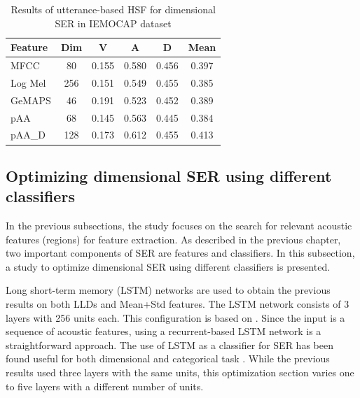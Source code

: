 
\begin{table}
    \caption{Results of utterance-based HSF for dimensional SER in IEMOCAP dataset}
    \begin{center}
    \begin{tabular}{l | c | c c c c}
      \hline
Feature & Dim & V & A & D & Mean \\
\hline \hline
MFCC      &   80  & 0.155 & 0.580   & 0.456 & 0.397 \\
Log Mel   &   256 & 0.151 & 0.549   & 0.455 & 0.385 \\
GeMAPS    &   46  & 0.191 & 0.523   & 0.452 & 0.389 \\
pAA       &   68  & 0.145 & 0.563   & 0.445 & 0.384 \\
pAA\_D     &  128  & 0.173 & 0.612   & 0.455 & 0.413 \\
      \hline
    \end{tabular}
    \label{tab:iemocap-hsf}
  \end{center}
\end{table}

\subsection{Optimizing dimensional SER using different classifiers}
In the previous subsections, the study focuses on the search for relevant
acoustic features (regions) for feature extraction. As described in the
previous chapter, two important components of SER are features and classifiers.
In this subsection, a study to optimize dimensional SER using different
classifiers is presented. 

Long short-term memory (LSTM) networks are used to obtain the previous results
on both LLDs and Mean+Std features. The LSTM network consists of 3 layers with
256 units each. This configuration is based on \cite{Atmaja2020d}. Since the
input is a sequence of acoustic features, using a recurrent-based LSTM network
is a straightforward approach. The use of LSTM as a classifier for SER has been
found useful for both dimensional \cite{Schmitt2018} and categorical task
\cite{Atmaja2019}. While the previous results used three layers with the same
units, this optimization section varies one to five layers with a different
number of units.

